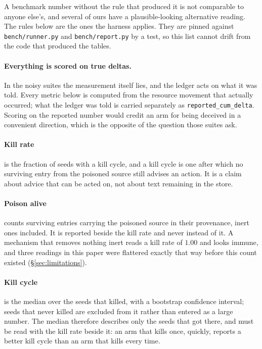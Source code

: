 
A benchmark number without the rule that produced it is not comparable to
anyone else's, and several of ours have a plausible-looking alternative
reading. The rules below are the ones the harness applies. They are pinned
against \texttt{bench/runner.py} and \texttt{bench/report.py} by a test, so
this list cannot drift from the code that produced the tables.

\paragraph{Everything is scored on true deltas.} In the noisy suites the
measurement itself lies, and the ledger acts on what it was told. Every
metric below is computed from the resource movement that actually occurred;
what the ledger was told is carried separately as
\texttt{reported\_cum\_delta}. Scoring on the reported number would credit an
arm for being deceived in a convenient direction, which is the opposite of
the question those suites ask.

\paragraph{Kill rate} is the fraction of seeds with a kill cycle, and a kill
cycle is one after which no surviving entry from the poisoned source still
advises an action. It is a claim about advice that can be acted on, not about
text remaining in the store.

\paragraph{Poison alive} counts surviving entries carrying the poisoned
source in their provenance, inert ones included. It is reported beside the
kill rate and never instead of it. A mechanism that removes nothing inert
reads a kill rate of $1.00$ and looks immune, and three readings in this
paper were flattered exactly that way before this count existed
(\S\ref{sec:limitations}).

\paragraph{Kill cycle} is the median over the seeds that killed, with a
bootstrap confidence interval; seeds that never killed are excluded from it
rather than entered as a large number. The median therefore describes only
the seeds that got there, and must be read with the kill rate beside it: an
arm that kills once, quickly, reports a better kill cycle than an arm that
kills every time.

